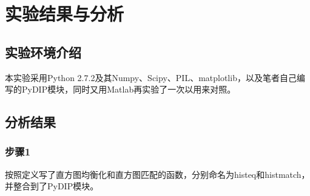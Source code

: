 \documentclass[]{IEEEphot}
\begin{document}
\section{实验结果与分析}
\subsection{实验环境介绍}
本实验采用Python 2.7.2及其Numpy、Scipy、PIL、matplotlib，以及笔者自己编写的PyDIP模块，同时又用Matlab再实验了一次以用来对照。
\subsection{分析结果}
\subsubsection{步骤1}
按照定义写了直方图均衡化和直方图匹配的函数，分别命名为histeq和histmatch，并整合到了PyDIP模块。
\end{document}
